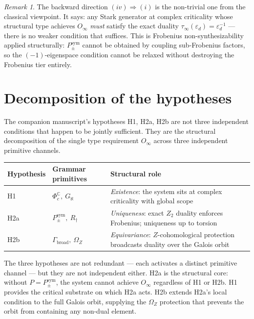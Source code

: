 \documentclass[12pt]{article}
\theoremstyle{plain}
\theoremstyle{definition}
\theoremstyle{remark}
\newtheorem{remark}[theoreminner]{Remark}
\newcommand{\tauinf}{\tau_\infty}
\newcommand{\epsd}{\varepsilon_d}
\begin{document}
\begin{remark}
The backward direction $(iv) \Rightarrow (i)$ is the non-trivial one from the classical
viewpoint. It says: any Stark generator at complex criticality whose structural type achieves
$O_\infty$ \emph{must} satisfy the exact duality $\tauinf(\epsd) = \epsd^{-1}$ — there is no
weaker condition that suffices. This is Frobenius non-synthesizability applied structurally:
$P_{\pm}^{\text{sym}}$ cannot be obtained by coupling sub-Frobenius factors, so the $(-1)$-eigenspace
condition cannot be relaxed without destroying the Frobenius tier entirely.
\end{remark}

\section{Decomposition of the hypotheses}
\label{sec:decomposition}

The companion manuscript's hypotheses H1, H2a, H2b are not three independent conditions that
happen to be jointly sufficient. They are the structural decomposition of the single type
requirement $O_\infty$ across three independent primitive channels.

\begin{center}
\begin{tabular}{@{}lll@{}}
\toprule
Hypothesis & Grammar primitives & Structural role \\
\midrule
H1  & $\Phi_c^\mathbb{C},\ G_\aleph$ & \emph{Existence}: the system sits at complex criticality
  with global scope \\
H2a & $P_{\pm}^{\text{sym}},\ R_\dagger$ & \emph{Uniqueness}: exact $Z_2$ duality enforces
  Frobenius; uniqueness up to torsion \\
H2b & $\Gamma_\text{broad},\ \Omega_Z$ & \emph{Equivariance}: $Z$-cohomological protection
  broadcasts duality over the Galois orbit \\
\bottomrule
\end{tabular}
\end{center}

\medskip

The three hypotheses are not redundant — each activates a distinct primitive channel — but they
are not independent either. H2a is the structural core: without $P = P_{\pm}^{\text{sym}}$,
the system cannot achieve $O_\infty$ regardless of H1 or H2b. H1 provides the critical substrate
on which H2a acts. H2b extends H2a's local condition to the full Galois orbit, supplying the
$\Omega_Z$ protection that prevents the orbit from containing any non-dual element.
\end{document}
